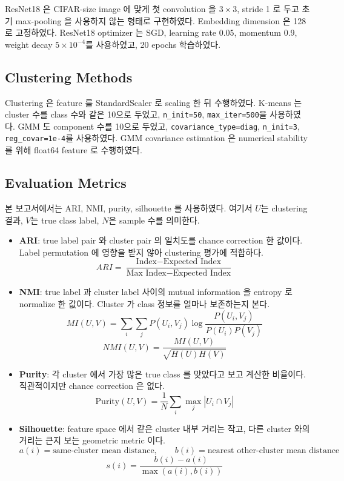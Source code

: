 \documentclass[11pt]{article}
\begin{document}
ResNet18 은 CIFAR-size image 에 맞게 첫 convolution 을 \(3\times3\), stride 1 로 두고 초기 max-pooling 을 사용하지 않는 형태로 구현하였다.
Embedding dimension 은 128 로 고정하였다.
ResNet18 optimizer 는 SGD, learning rate 0.05, momentum 0.9, weight decay \(5\times10^{-4}\)를 사용하였고, 20 epochs 학습하였다.

\subsection{Clustering Methods}

Clustering 은 feature 를 StandardScaler 로 scaling 한 뒤 수행하였다.
K-means 는 cluster 수를 class 수와 같은 10으로 두었고, \texttt{n\_init=50}, \texttt{max\_iter=500}을 사용하였다.
GMM 도 component 수를 10으로 두었고, \texttt{covariance\_type=diag}, \texttt{n\_init=3}, \texttt{reg\_covar=1e-4}를 사용하였다.
GMM covariance estimation 은 numerical stability 를 위해 float64 feature 로 수행하였다.

\subsection{Evaluation Metrics}

본 보고서에서는 ARI, NMI, purity, silhouette 를 사용하였다.
여기서 \(U\)는 clustering 결과, \(V\)는 true class label, \(N\)은 sample 수를 의미한다.

\begin{itemize}[leftmargin=*]
    \item \textbf{ARI}: true label pair 와 cluster pair 의 일치도를 chance correction 한 값이다. Label permutation 에 영향을 받지 않아 clustering 평가에 적합하다.
    \[
        ARI =
        \frac{
        \text{Index} - \text{Expected Index}
        }{
        \text{Max Index} - \text{Expected Index}
        }
    \]
    \item \textbf{NMI}: true label 과 cluster label 사이의 mutual information 을 entropy 로 normalize 한 값이다. Cluster 가 class 정보를 얼마나 보존하는지 본다.
    \[
        MI(U,V) =
        \sum_i \sum_j
        P(U_i, V_j)
        \log
        \frac{
        P(U_i, V_j)
        }{
        P(U_i)P(V_j)
        }
    \]
    \[
        NMI(U,V) =
        \frac{
        MI(U,V)
        }{
        \sqrt{H(U)H(V)}
        }
    \]
    \item \textbf{Purity}: 각 cluster 에서 가장 많은 true class 를 맞았다고 보고 계산한 비율이다. 직관적이지만 chance correction 은 없다.
    \[
        \mathrm{Purity}(U,V) =
        \frac{1}{N}
        \sum_i \max_j |U_i \cap V_j|
    \]
    \item \textbf{Silhouette}: feature space 에서 같은 cluster 내부 거리는 작고, 다른 cluster 와의 거리는 큰지 보는 geometric metric 이다.
    \[
        a(i) = \text{same-cluster mean distance}, \qquad
        b(i) = \text{nearest other-cluster mean distance}
    \]
    \[
        s(i) =
        \frac{
        b(i) - a(i)
        }{
        \max(a(i), b(i))
        }
    \]
\end{itemize}
\end{document}
